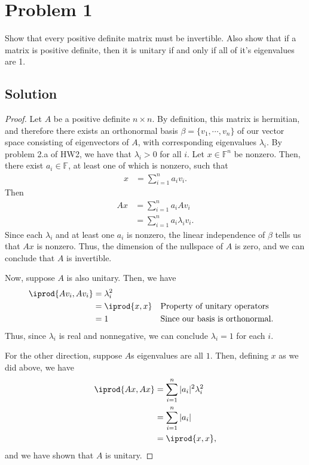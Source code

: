 \documentclass[10pt,a4paper]{article}
\author{Jeremiah Givens}
\theoremstyle{definition}
\begin{document}
\section*{Problem 1}
Show that every positive definite matrix must be invertible. Also show that if a matrix is positive definite, then it is unitary if and only if all of it's eigenvalues are 1.

\subsection*{Solution}
\begin{proof}
Let $A$ be a positive definite $n \times n$. By definition, this matrix is hermitian, and therefore there exists an orthonormal basis $\beta = \{v_1, \cdots, v_n\}$ of our vector space consisting of eigenvectors of $A$, with corresponding eigenvalues $\lambda_i$. By  problem 2.a of HW2, we have that $\lambda_i > 0$ for all $i$. Let $x \in \mathbb{F}^n$ be nonzero. Then, there exist $a_i \in \mathbb{F}$, at least one of which is nonzero, such that 
\begin{align*}
x &= \sum_{i=1}^n a_i v_i.
\end{align*}
Then
\begin{align*}
Ax &= \sum_{i=1}^n a_i Av_i\\
&= \sum_{i=1}^n a_i \lambda_i v_i.
\end{align*}
Since each $\lambda_i$ and at least one $a_i$ is nonzero, the linear independence of $\beta$ tells us that $Ax$ is nonzero. Thus, the dimension of the nullspace of $A$ is zero, and we can conclude that $A$ is invertible.

Now, suppose $A$ is also unitary. Then, we have 
\begin{align*}
\iprod{Av_i, Av_i} &= \lambda_i^2\\
&= \iprod{x,x} &&\text{Property of unitary operators}\\
&= 1 && \text{Since our basis is orthonormal}.
\end{align*}
Thus, since $\lambda_i$ is real and nonnegative, we can conclude $\lambda_i = 1$ for each $i$.

For the other direction, suppose $A$s eigenvalues are all $1$. Then, defining $x$ as we did above, we have
\begin{align*}
\iprod{Ax, Ax} &= \sum_{i=1}^n |a_i|^2 \lambda_i^2\\
&= \sum_{i=1}^n |a_i|\\
&= \iprod{x, x},
\end{align*}
and we have shown that $A$ is unitary.
\end{proof}
\end{document}
